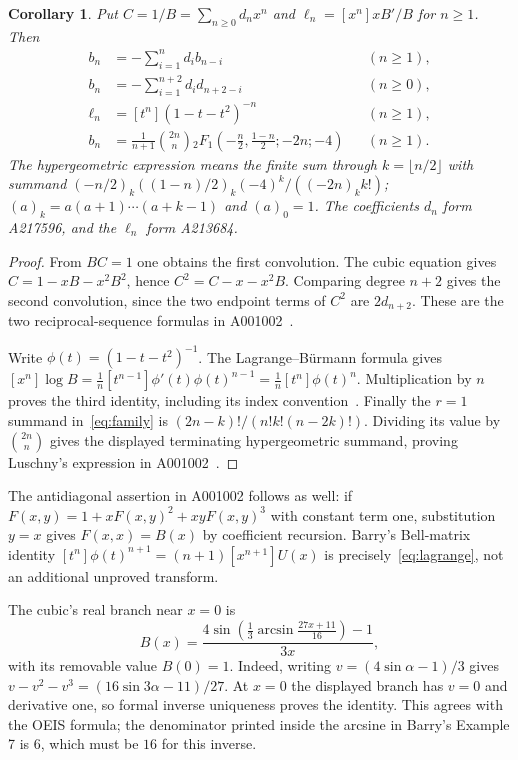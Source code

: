 \documentclass[10pt]{article}
\newtheorem{corollary}[theorem]{Corollary}
\begin{document}
\begin{corollary}\label{cor:reciprocal}
Put $C=1/B=\sum_{n\geq0}d_nx^n$ and
$\ell_n=[x^n]xB'/B$ for $n\geq1$. Then
\begin{align}
 b_n&=-\sum_{i=1}^n d_i b_{n-i} &&(n\geq1),\\
 b_n&=-\sum_{i=1}^{n+2}d_i d_{n+2-i} &&(n\geq0),\\
 \ell_n&=[t^n](1-t-t^2)^{-n} &&(n\geq1),\\
 b_n&=\frac1{n+1}\binom{2n}{n}
 {}_2F_1\!\left(-\frac n2,\frac{1-n}2;-2n;-4\right) &&(n\geq1).
\end{align}
The hypergeometric expression means the finite sum through
$k=\lfloor n/2\rfloor$ with summand
$(-n/2)_k((1-n)/2)_k(-4)^k/((-2n)_k k!)$;
$(a)_k=a(a+1)\cdots(a+k-1)$ and $(a)_0=1$.
The coefficients $d_n$ form A217596, and the $\ell_n$ form A213684.
\end{corollary}
\begin{proof}
From $BC=1$ one obtains the first convolution. The cubic equation gives
$C=1-xB-x^2B^2$, hence $C^2=C-x-x^2B$. Comparing degree $n+2$
gives the second convolution, since the two endpoint terms of $C^2$
are $2d_{n+2}$. These are the two reciprocal-sequence formulas in
A001002~\cite{oeis1,reciprocal}.

Write $\phi(t)=(1-t-t^2)^{-1}$. The Lagrange--B\"urmann formula gives
$[x^n]\log B=\frac1n[t^{n-1}]\phi'(t)\phi(t)^{n-1}
=\frac1n[t^n]\phi(t)^n$. Multiplication by $n$ proves the third identity,
including its index convention~\cite{logderivative}.
Finally the $r=1$ summand in~\eqref{eq:family} is
$(2n-k)!/(n!k!(n-2k)!)$. Dividing its value by $\binom{2n}{n}$
gives the displayed terminating hypergeometric summand, proving
Luschny's expression in A001002~\cite{oeis1}.
\end{proof}

The antidiagonal assertion in A001002 follows as well: if
$F(x,y)=1+xF(x,y)^2+xyF(x,y)^3$ with constant term one, substitution
$y=x$ gives $F(x,x)=B(x)$ by coefficient recursion. Barry's Bell-matrix
identity $[t^n]\phi(t)^{n+1}=(n+1)[x^{n+1}]U(x)$
\cite[Theorem 3]{barry} is precisely~\eqref{eq:lagrange}, not an
additional unproved transform.

The cubic's real branch near $x=0$ is
\[
 B(x)=\frac{4\sin\!\left(\frac13\arcsin\frac{27x+11}{16}\right)-1}{3x},
\]
with its removable value $B(0)=1$. Indeed, writing
$v=(4\sin\alpha-1)/3$ gives $v-v^2-v^3=(16\sin3\alpha-11)/27$.
At $x=0$ the displayed branch has $v=0$ and derivative one, so formal
inverse uniqueness proves the identity. This agrees with the OEIS formula;
the denominator printed inside the arcsine in Barry's Example 7 is $6$,
which must be $16$ for this inverse.
\end{document}
